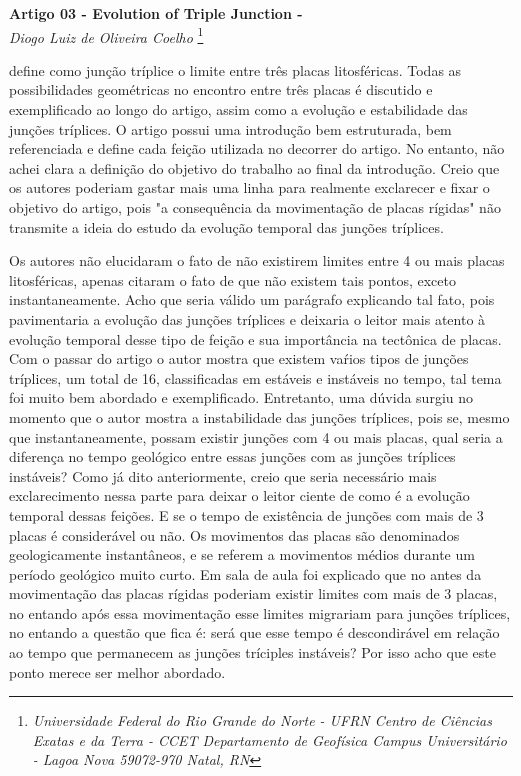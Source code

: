 \documentclass[manuscript]{geophysics}
\begin{document}
\begin{center}
\textbf{\LARGE
 Artigo 03 - Evolution of Triple Junction - \cite{mckenzie_evolution_1969}} \\
\textit{Diogo Luiz de Oliveira Coelho}
\footnote{\textit{Universidade Federal do Rio Grande do Norte - UFRN
Centro de Ciências Exatas e da Terra - CCET
Departamento de Geofísica
Campus Universitário - Lagoa Nova
59072-970 Natal, RN}}
\end{center} 

\cite{mckenzie_evolution_1969} define como junção tríplice o limite entre três placas litosféricas. Todas as possibilidades geométricas no encontro entre três placas é discutido e exemplificado ao longo do artigo, assim como a evolução e estabilidade das junções tríplices. O artigo possui uma introdução bem estruturada, bem referenciada e define cada feição utilizada no decorrer do artigo. No entanto, não achei clara a definição do objetivo do trabalho ao final da introdução. Creio que os autores poderiam gastar mais uma linha para realmente exclarecer e fixar o objetivo do artigo, pois "a consequência da movimentação de placas rígidas" não transmite a ideia do estudo da evolução temporal das junções tríplices. 

Os autores não elucidaram o fato de não existirem limites entre 4 ou mais placas litosféricas, apenas citaram o fato de que não existem tais pontos, exceto instantaneamente. Acho que seria válido um parágrafo explicando tal fato, pois pavimentaria a evolução das junções tríplices e deixaria o leitor mais atento à evolução temporal desse tipo de feição e sua importância na tectônica de placas. Com o passar do artigo o autor mostra que existem vaŕios tipos de junções tríplices, um total de 16, classificadas em estáveis e instáveis no tempo, tal tema foi muito bem abordado e exemplificado. Entretanto, uma dúvida surgiu no momento que o autor mostra a instabilidade das junções tríplices, pois se, mesmo que instantaneamente, possam existir junções com 4 ou mais placas, qual seria a diferença no tempo geológico entre essas junções com as junções tríplices instáveis? Como já dito anteriormente, creio que seria necessário mais exclarecimento nessa parte para deixar o leitor ciente de como é a evolução temporal dessas feições. E se o tempo de existência de junções com mais de 3 placas é considerável ou não. Os movimentos das placas são denominados geologicamente instantâneos, e se referem a movimentos médios durante um período geológico muito curto. Em sala de aula foi explicado que no antes da movimentação das placas rígidas poderiam existir limites com mais de 3 placas, no entando após essa movimentação esse limites migrariam para junções tríplices, no entando a questão que fica é: será que esse tempo é descondirável em relação ao tempo que permanecem as junções tríciples instáveis? Por isso acho que este ponto merece ser melhor abordado.



    
\end{document}
